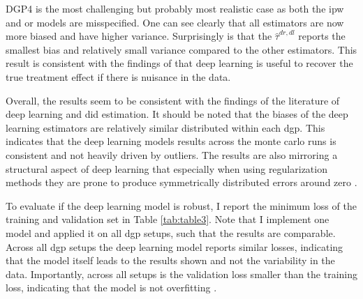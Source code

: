 DGP4 is the most challenging but probably most realistic case as both the \ac{ipw} and \ac{or} models are misspecified.
One can see clearly that all estimators are now more biased and have higher variance.
Surprisingly is that the $\hat{\tau}^{dr,dl}$ reports the smallest bias and relatively small variance compared to the other estimators.
This result is consistent with the findings of \citet{belloni2017program,chernozhukovDoubleDebiasedMachine2018,farrellDeepNeuralNetworks2021} that deep learning is useful to recover the true treatment effect if there is nuisance in the data.



Overall, the results seem to be consistent with the findings of the literature of deep learning and \ac{did} estimation.
It should be noted that the biases of the deep learning estimators are relatively similar distributed within each \ac{dgp}.
This indicates that the deep learning models results across the monte carlo runs is consistent and not heavily driven by outliers.
The results are also mirroring a structural aspect of deep learning that especially when using regularization methods they are prone to produce symmetrically distributed errors around zero \citep{koh2017understanding}.

To evaluate if the deep learning model is robust, I report the minimum loss of the training and validation set in Table \ref{tab:table3}.
Note that I implement one model and applied it on all \ac{dgp} setups, such that the results are comparable.
Across all \ac{dgp} setups the deep learning model reports similar losses, indicating that the model itself leads to the results shown and not the variability in the data.
Importantly, across all setups is the validation loss smaller than the training loss, indicating that the model is not overfitting \citep[see][]{Goodfellow-et-al-2016,farrellDeepNeuralNetworks2021}.





